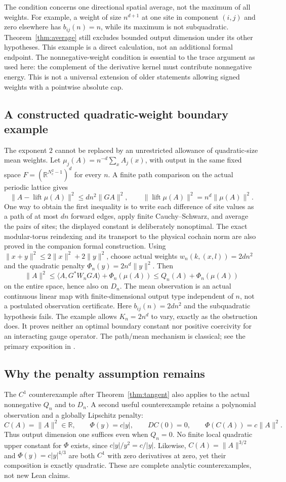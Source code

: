 \documentclass[11pt]{article}
\newcommand{\R}{\mathbb R}
\newcommand{\ip}[2]{\langle #1,#2\rangle}
\begin{document}
The condition concerns one directional spatial average, not the maximum
of all weights. For example, a weight of size $n^{d+1}$ at one site in
component $(i,j)$ and zero elsewhere has $b_{ij}(n)=n$, while its maximum
is not subquadratic. Theorem~\ref{thm:average} still excludes bounded
output dimension under its other hypotheses. This example is a direct
calculation, not an additional formal endpoint. The nonnegative-weight
condition is essential to the trace argument as used here: the complement
of the derivative kernel must contribute nonnegative energy. This is not
a universal extension of older statements allowing signed weights with a
pointwise absolute cap.

\subsection{A constructed quadratic-weight boundary example}
The exponent $2$ cannot be replaced by an unrestricted allowance of
quadratic-size mean weights. Let
$\mu_j(A)=n^{-d}\sum_x A_j(x)$, with output in the same fixed space
$F=(\R^{N_c^2-1})^d$ for every $n$. A finite path comparison on the actual
periodic lattice gives
\[
 \|A-\operatorname{lift}\mu(A)\|^2\leq d n^2\|GA\|^2,
 \qquad \|\operatorname{lift}\mu(A)\|^2=n^d\|\mu(A)\|^2.
\]
One way to obtain the first inequality is to write each difference of
site values as a path of at most $dn$ forward edges, apply finite
Cauchy--Schwarz, and average the pairs of sites; the displayed constant
is deliberately nonoptimal. The exact modular-torus reindexing and its
transport to the physical cochain norm are also proved in the companion
formal construction.
Using $\|x+y\|^2\leq2\|x\|^2+2\|y\|^2$, choose actual weights
$w_n(k,(x,l))=2dn^2$ and the quadratic penalty
$\Phi_n(y)=2n^d\|y\|^2$. Then
\[
 \|A\|^2\leq\ip{A}{G^*W_nGA}+\Phi_n(\mu(A))
                  \leq Q_n(A)+\Phi_n(\mu(A))
\]
on the entire space, hence also on $D_n$. The mean observation is an
actual continuous linear map with finite-dimensional output type
independent of $n$, not a postulated observation certificate. Here
$b_{ij}(n)=2dn^2$ and the subquadratic hypothesis fails. The example
allows $K_n=2n^d$ to vary, exactly as the obstruction does. It proves
neither an optimal boundary constant nor positive coercivity for an
interacting gauge operator. The path/mean mechanism is classical;
see the primary exposition in \cite{levin-peres}.

\subsection{Why the penalty assumption remains}
The $C^1$ counterexample after Theorem~\ref{thm:tangent} also applies to
the actual nonnegative $Q_n$ and to $D_n$. A second useful counterexample
retains a polynomial observation and a globally Lipschitz penalty:
\[
 C(A)=\|A\|^2\in\R,\qquad \Phi(y)=c|y|,
 \qquad DC(0)=0,\qquad \Phi(C(A))=c\|A\|^2.
\]
Thus output dimension one suffices even when $Q_n=0$. No finite local
quadratic upper constant for $\Phi$ exists, since $c|y|/y^2=c/|y|$.
Likewise, $C(A)=\|A\|^{3/2}$ and $\Phi(y)=c|y|^{4/3}$ are both $C^1$
with zero derivatives at zero, yet their composition is exactly quadratic.
These are complete analytic counterexamples, not new Lean claims.
\end{document}
